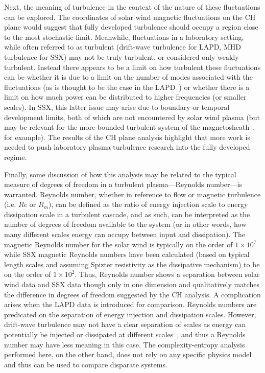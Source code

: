 \documentclass[aps,prx,twocolumn,secnumarabic,nobalancelastpage,amsmath,amssymb,
nofootinbib]{revtex4-1}
\begin{document}
Next, the meaning of turbulence in the context of the nature of these fluctuations can be explored. The coordinates of solar wind magnetic fluctuations on the CH plane would suggest that fully developed turbulence should occupy a region close to the most stochastic limit. Meanwhile, fluctuations in a laboratory setting, while often referred to as turbulent (drift-wave turbulence for LAPD, MHD turbulence for SSX) may not be truly turbulent, or considered only weakly turbulent. Instead there appears to be a limit on how turbulent these fluctuations can be whether it is due to a limit on the number of modes associated with the fluctuations (as is thought to be the case in the LAPD~\cite{maggs2013}) or whether there is a limit on how much power can be distributed to higher frequencies (or smaller scales). In SSX, this latter issue may arise due to boundary or temporal development limits, both of which are not encountered by solar wind plasma (but may be relevant for the more bounded turbulent system of the magnetosheath~\cite{SahraouiPRL2006,YordanovaPRL2008}, for example). The results of the CH plane analysis highlight that more work is needed to push laboratory plasma turbulence research into the fully developed regime.
 
Finally, some discussion of how this analysis may be related to the typical measure of degrees of freedom in a turbulent plasma---Reynolds number---is warranted. Reynolds number, whether in reference to flow or magnetic turbulence (i.e. $Re$ or $R_{m}$), can be defined as the ratio of energy injection scale to energy dissipation scale in a turbulent cascade, and as such, can be interpreted as the number of degrees of freedom available to the system (or in other words, how many different scales energy can occupy between input and dissipation). The magnetic Reynolds number for the solar wind is typically on the order of $1 \times 10^7$ while SSX magnetic Reynolds numbers have been calculated (based on typical length scales and assuming Spizter resistivity as the dissipative mechanism) to be on the order of $1 \times 10^2$. Thus, Reynolds number shows a separation between solar wind data and SSX data though only in one dimension and qualitatively matches the difference in degrees of freedom suggested by the CH analysis. A complication arises when the LAPD data is introduced for comparison. Reynolds numbers are predicated on the separation of energy injection and dissipation scales. However, drift-wave turbulence may not have a clear separation of scales as energy can potentially be injected or dissipated at different scales~\cite{friedman2012}, and thus a Reynolds number may have less meaning in this case. The complexity-entropy analysis performed here, on the other hand, does not rely on any specific physics model and thus can be used to compare disparate systems.
\end{document}
